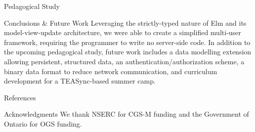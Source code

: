 \documentclass[22pt]{beamer}
\begin{document}
\begin{frame}[fragile]
\begin{textblock}{7.25}
\begin{block}{\fontsize{37}{20}\selectfont Pedagogical Study}
        \end{block}

        \begin{block}{\fontsize{37}{20}\selectfont Conclusions \& Future Work}
            Leveraging the strictly-typed nature of Elm and its model-view-update architecture, we were able
            to create a simplified multi-user framework, requiring the programmer to write no server-side code. In addition to the upcoming pedagogical study, future work includes a data modelling extension allowing persistent, structured data, an
            authentication/authorization scheme, a binary data format to reduce network communication, and
            curriculum development for a TEASync-based summer camp.
        \end{block}


        \begin{block}{\fontsize{37}{20}\selectfont References}
            
            {\scriptsize
                }
        \end{block}

        \begin{block}{\fontsize{37}{20}\selectfont Acknowledgments}
            We thank NSERC for CGS-M funding and the Government of Ontario for OGS funding.
        \end{block}


    \end{textblock}



\end{frame}
\end{document}
